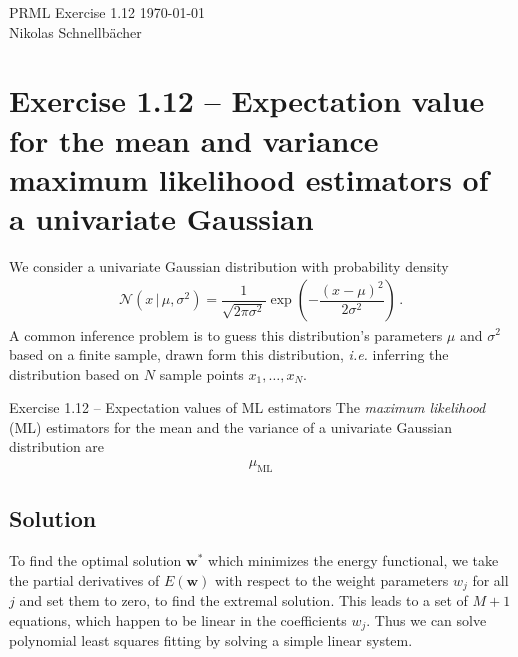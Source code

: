 \documentclass[11pt,DINA4, fleqn]{amsart}
\def\vw{\boldsymbol{w}\xspace}
\begin{document}

\tikzset{node distance = 2cm, auto}



\begin{flushleft}
{\sc \Large PRML Exercise 1.12} \hfill \today \\
\medskip
Nikolas Schnellbächer \underline{\hspace{6.53in}} \\
\end{flushleft}

\section*{Exercise 1.12 -- Expectation value for the mean and variance maximum likelihood estimators of a univariate Gaussian}
We consider a univariate Gaussian distribution with probability density
\begin{align}
\mathcal{N}\left(x \,\bigl| \, \mu, \sigma^2\right) = \dfrac{1}{\sqrt{2\pi \sigma^2}}\exp\left(-\dfrac{(x-\mu)^2}{2\sigma^2}\right) \, .
\end{align}
A common inference problem is to guess this distribution's parameters $\mu$ and $\sigma^2$ based on a finite sample, drawn form this distribution, \textit{i.e.}
inferring the distribution based on $N$ sample points $x_1, \dots, x_N$.

\begin{mybox_tc3}{Exercise 1.12 -- Expectation values of ML estimators}
The \emph{maximum likelihood} (ML) estimators for the mean and the variance of a univariate Gaussian distribution are
\begin{align}
\mu_{\text{ML}}
\end{align}
\end{mybox_tc3}

\subsection*{Solution}
To find the optimal solution $\vw^*$ which minimizes the energy functional, we take the partial derivatives of $E(\vw)$ with respect to the weight parameters $w_j$ for all $j$ and set them to zero, to find the extremal solution. This leads to a set of $M+1$ equations, which happen to be linear in the coefficients $w_j$. Thus we can solve polynomial least squares fitting by solving a simple linear system.
\end{document}
